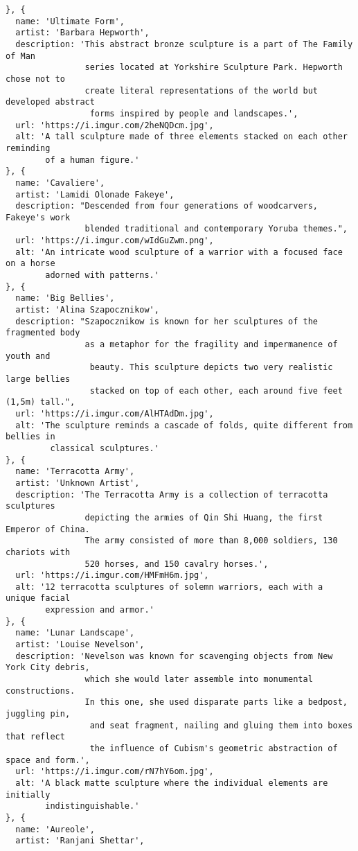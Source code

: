 \begin{verbatim}
}, {
  name: 'Ultimate Form',
  artist: 'Barbara Hepworth',
  description: 'This abstract bronze sculpture is a part of The Family of Man 
                series located at Yorkshire Sculpture Park. Hepworth chose not to 
                create literal representations of the world but developed abstract
                 forms inspired by people and landscapes.',
  url: 'https://i.imgur.com/2heNQDcm.jpg',
  alt: 'A tall sculpture made of three elements stacked on each other reminding 
        of a human figure.'
}, {
  name: 'Cavaliere',
  artist: 'Lamidi Olonade Fakeye',
  description: "Descended from four generations of woodcarvers, Fakeye's work 
                blended traditional and contemporary Yoruba themes.",
  url: 'https://i.imgur.com/wIdGuZwm.png',
  alt: 'An intricate wood sculpture of a warrior with a focused face on a horse 
        adorned with patterns.'
}, {
  name: 'Big Bellies',
  artist: 'Alina Szapocznikow',
  description: "Szapocznikow is known for her sculptures of the fragmented body 
                as a metaphor for the fragility and impermanence of youth and
                 beauty. This sculpture depicts two very realistic large bellies 
                 stacked on top of each other, each around five feet (1,5m) tall.",
  url: 'https://i.imgur.com/AlHTAdDm.jpg',
  alt: 'The sculpture reminds a cascade of folds, quite different from bellies in
         classical sculptures.'
}, {
  name: 'Terracotta Army',
  artist: 'Unknown Artist',
  description: 'The Terracotta Army is a collection of terracotta sculptures 
                depicting the armies of Qin Shi Huang, the first Emperor of China. 
                The army consisted of more than 8,000 soldiers, 130 chariots with 
                520 horses, and 150 cavalry horses.',
  url: 'https://i.imgur.com/HMFmH6m.jpg',
  alt: '12 terracotta sculptures of solemn warriors, each with a unique facial
        expression and armor.'
}, {
  name: 'Lunar Landscape',
  artist: 'Louise Nevelson',
  description: 'Nevelson was known for scavenging objects from New York City debris, 
                which she would later assemble into monumental constructions. 
                In this one, she used disparate parts like a bedpost, juggling pin,
                 and seat fragment, nailing and gluing them into boxes that reflect 
                 the influence of Cubism's geometric abstraction of space and form.',
  url: 'https://i.imgur.com/rN7hY6om.jpg',
  alt: 'A black matte sculpture where the individual elements are initially 
        indistinguishable.'
}, {
  name: 'Aureole',
  artist: 'Ranjani Shettar',

\end{verbatim}
